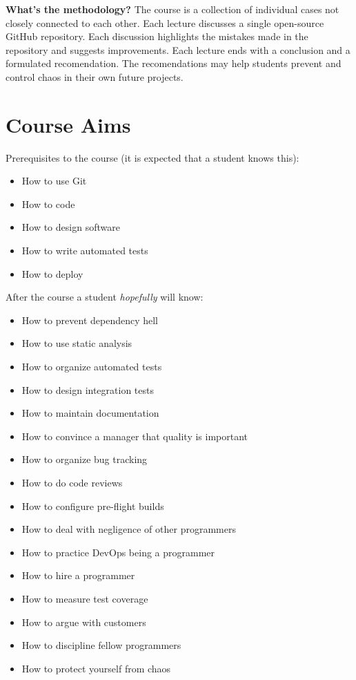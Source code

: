 \documentclass[nobrand,anonymous,nodate,nosecurity]{huawei}
\begin{document}
{\textbf{What's the methodology?}
The course is a collection of individual cases not
closely connected to each other. Each lecture discusses a single open-source
GitHub repository. Each discussion highlights the mistakes made in the
repository and suggests improvements. Each lecture ends with a conclusion
and a formulated recomendation. The recomendations may help students
prevent and control chaos in their own future projects.

\newpage
\section*{Course Aims}

Prerequisites to the course (it is expected that a student knows this):

\begin{itemize}
\item How to use Git
\item How to code
\item How to design software
\item How to write automated tests
\item How to deploy
\end{itemize}

After the course a student \emph{hopefully} will know:

\begin{itemize}
\item How to prevent dependency hell
\item How to use static analysis
\item How to organize automated tests
\item How to design integration tests
\item How to maintain documentation
\item How to convince a manager that quality is important
\item How to organize bug tracking
\item How to do code reviews
\item How to configure pre-flight builds
\item How to deal with negligence of other programmers
\item How to practice DevOps being a programmer
\item How to hire a programmer
\item How to measure test coverage
\item How to argue with customers
\item How to discipline fellow programmers
\item How to protect yourself from chaos
\end{itemize}

}
\end{document}
